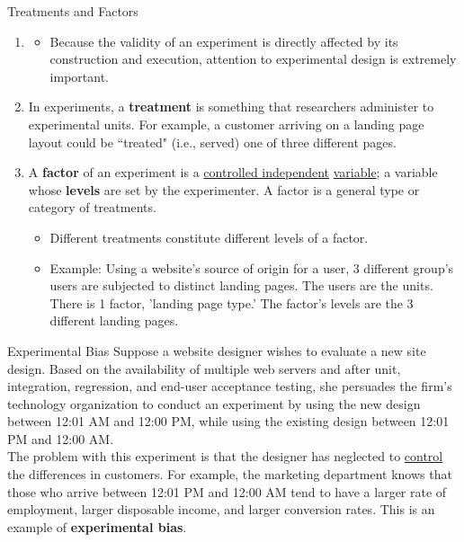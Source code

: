 \documentclass[pdf]{beamer}
\newcommand{\empr}[1]{{\color{franklinblue}\textbf{#1}}}
\theoremstyle{remark}
\theoremstyle{definition}
\begin{document}
\begin{frame}[t]{Treatments and Factors}
\begin{enumerate}
  \item []
\begin{itemize}
\item  Because the validity of an experiment is directly affected by its construction and execution, attention to experimental design is extremely important.
\end{itemize}
\vspace{-0.5ex}
  \setcounter{enumi}{1}
\item In experiments, a \empr{treatment} is something that researchers administer to experimental units.  For example, a customer arriving on a landing page layout could be ``treated" (i.e., served) one of three different pages. 
\item A \empr{factor} of an experiment is a \underline{controlled independent} \underline{variable}; a variable whose \empr{levels} are set by the experimenter.  A factor is a general type or category of treatments.  
\begin{itemize}
\item Different treatments constitute different levels of a factor.
\item Example: Using a website's source of origin for a user, 3 different group's users are subjected to distinct landing pages.  The users are the units.  There is 1 factor, 'landing page type.'  The factor's levels are the 3 different landing pages.
\end{itemize}
\end{enumerate}
\end{frame}

\begin{frame}[t]{Experimental Bias}
Suppose a website designer wishes to evaluate a new site design.  Based on the availability of multiple web servers and after unit, integration, regression, and end-user acceptance testing, she persuades the firm's technology organization to conduct an experiment by using the new design between 12:01 AM and 12:00 PM, while using the existing design between 12:01 PM and 12:00 AM. \\
\vspace{1.5ex}
The {\color{red} problem} with this experiment is that the designer has neglected to \underline{control} the differences in customers.  For example, the marketing department knows that those who arrive between 12:01 PM and 12:00 AM tend to have a larger rate of employment, larger disposable income, and larger conversion rates. This is an example of \empr{experimental bias}. 
\end{frame}
\end{document}
